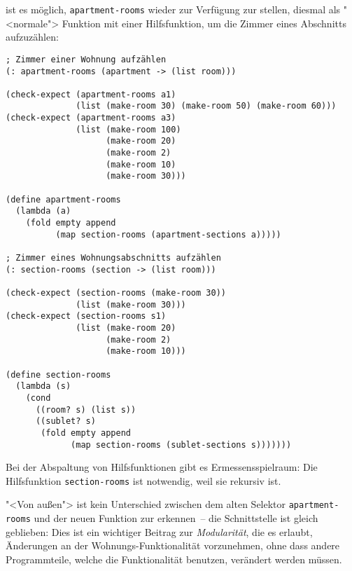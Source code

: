 ist es möglich, \texttt{apartment-rooms} wieder zur Verfügung zur
stellen, diesmal als "<normale"> Funktion mit einer Hilfsfunktion, um
die Zimmer eines Abschnitts aufzuzählen:
%
\begin{verbatim}
; Zimmer einer Wohnung aufzählen
(: apartment-rooms (apartment -> (list room)))

(check-expect (apartment-rooms a1)
              (list (make-room 30) (make-room 50) (make-room 60)))
(check-expect (apartment-rooms a3)
              (list (make-room 100)
                    (make-room 20)
                    (make-room 2)
                    (make-room 10)
                    (make-room 30)))

(define apartment-rooms
  (lambda (a)
    (fold empty append
          (map section-rooms (apartment-sections a)))))

; Zimmer eines Wohnungsabschnitts aufzählen
(: section-rooms (section -> (list room)))

(check-expect (section-rooms (make-room 30))
              (list (make-room 30)))
(check-expect (section-rooms s1)
              (list (make-room 20)
                    (make-room 2)
                    (make-room 10)))
              
(define section-rooms
  (lambda (s)
    (cond
      ((room? s) (list s))
      ((sublet? s)
       (fold empty append
             (map section-rooms (sublet-sections s)))))))
\end{verbatim}
%
Bei der Abspaltung von Hilfsfunktionen gibt es Ermessensspielraum:
Die Hilfsfunktion \texttt{section-rooms} ist notwendig, weil sie
rekursiv ist.

"<Von außen"> ist kein Unterschied zwischen dem alten Selektor
\texttt{apartment-rooms} und der neuen Funktion zur erkennen~-- die
Schnittstelle ist gleich geblieben: Dies ist ein wichtiger Beitrag zur
\textit{Modularität}, die es erlaubt, Änderungen an
der Wohnungs-Funktionalität vorzunehmen, ohne dass andere
Programmteile, welche die Funktionalität benutzen, verändert werden
müssen.

